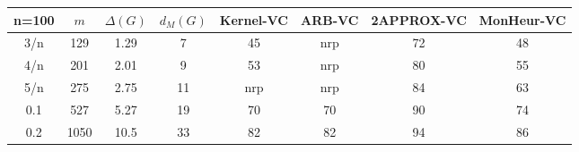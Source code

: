 \begin{tabular}{||c||ccc||cccc||}
 \hline \hline 
 n=100&$m$&$\Delta (G)$&$d_M(G)$& Kernel-VC & ARB-VC & 2APPROX-VC & MonHeur-VC\\ \hline \hline
3/n&129&1.29&7&45& nrp&72&48\\
4/n&201&2.01&9&53& nrp&80&55\\
5/n&275&2.75&11& nrp& nrp&84&63\\
0.1&527&5.27&19&70&70&90&74\\
0.2&1050&10.5&33&82&82&94&86\\
\hline \end{tabular}


